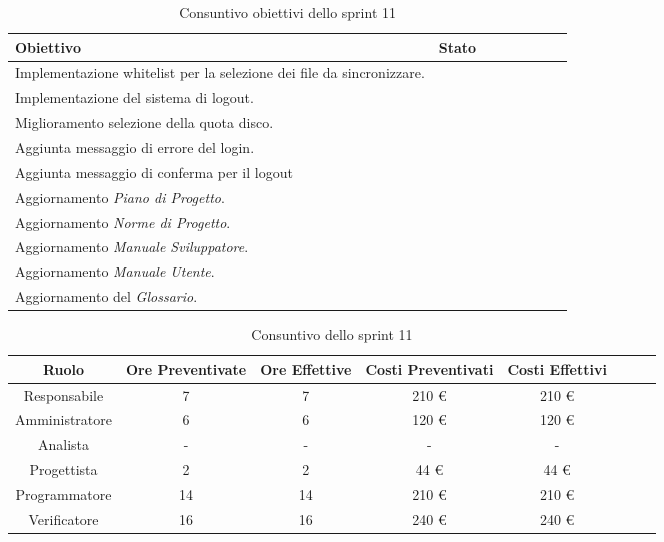 \begin{table}[H]
		\begin{center}
			\setlength{\aboverulesep}{0pt}
			\setlength{\belowrulesep}{0pt}
			\setlength{\extrarowheight}{.75ex}
			\begin{tabular}{ l c c c c c c c }
				\rowcolor{AzzurroGruppo!30} 
				\textbf{Obiettivo} & \textbf{Stato} \\
				\toprule
				Implementazione whitelist per la selezione dei file da sincronizzare. & \checkmark{} \\
				Implementazione del sistema di logout. & \checkmark{} \\
				Miglioramento selezione della quota disco. & \checkmark{} \\
				Aggiunta messaggio di errore del login. & \xmark{} \\
				Aggiunta messaggio di conferma per il logout & \checkmark{} \\
				Aggiornamento \textit{Piano di Progetto}. & \checkmark{} \\
				Aggiornamento \textit{Norme di Progetto}. & \checkmark{} \\
				Aggiornamento \textit{Manuale Sviluppatore}. & \checkmark{} \\
				Aggiornamento \textit{Manuale Utente}. & \checkmark{} \\
				Aggiornamento del \textit{Glossario}. & \checkmark{} \\
				\bottomrule
			\end{tabular}
			\caption{Consuntivo obiettivi dello sprint 11}
		\end{center}
	\end{table}

\begin{table}[H]
		\begin{center}
			\setlength{\aboverulesep}{0pt}
			\setlength{\belowrulesep}{0pt}
			\setlength{\extrarowheight}{.75ex}
			\begin{tabular}{ c c c c c c c c }
				\rowcolor{AzzurroGruppo!30} 
				\textbf{Ruolo} & \textbf{Ore Preventivate} & \textbf{Ore Effettive} & \textbf{Costi Preventivati} & \textbf{Costi Effettivi}\\
				\toprule
				Responsabile   & 7 & 7 & 210 \euro{}  & 210 \euro{}\\
				Amministratore & 6 & 6 & 120 \euro{}  & 120 \euro{} \\
				Analista       & - & - & - & - \\
				Progettista    & 2 & 2 & 44 \euro{} & 44 \euro{} \\
				Programmatore  & 14 & 14 & 210 \euro{}  & 210 \euro{} \\
				Verificatore   & 16 & 16 & 240 \euro{}  & 240 \euro{} \\
				\bottomrule
			\end{tabular}
			\caption{Consuntivo dello sprint 11}
		\end{center}
	\end{table}
	
